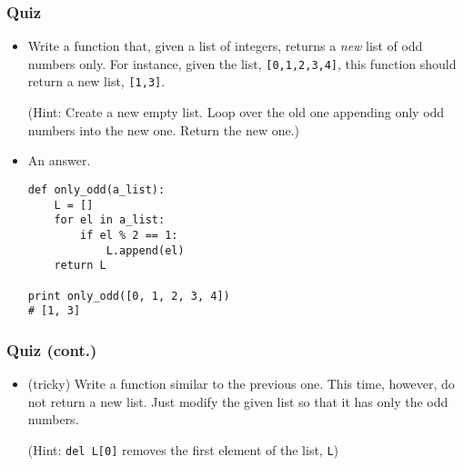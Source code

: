 \documentclass{beamer}
\begin{document}
\begin{frame}[fragile]
\frametitle{Quiz}
\begin{itemize}
\item<1-> Write a function that, given a list
    of integers, returns a \emph{new} list of odd numbers
    only. For instance, given the list, \lstinline{[0,1,2,3,4]},
    this function should return a new list,
    \lstinline{[1,3]}.

    (Hint: Create a new empty list. Loop over the
     old one appending only odd numbers into the new one.
     Return the new one.)
\item<2-> An answer.
\begin{lstlisting}
def only_odd(a_list):
    L = []
    for el in a_list:
        if el % 2 == 1:
            L.append(el)
    return L

print only_odd([0, 1, 2, 3, 4])
# [1, 3]
\end{lstlisting}
\end{itemize}
\end{frame}

\begin{frame}[fragile]
\frametitle{Quiz (cont.)}
\begin{itemize}
\item (tricky) Write a function similar to the previous one.
    This time, however, do not return a new list.
    Just modify the given list so that it has only
    the odd numbers.

    (Hint: \lstinline{del L[0]} removes
    the first element of the list, \lstinline{L})
\end{itemize}
\end{frame}
\end{document}
